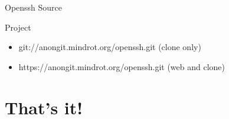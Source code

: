 \documentclass[10pt, compress, aspectratio=169]{beamer}
\begin{document}
\begin{frame}{Openssh Source}
  \begin{alertblock}{Project}
    \begin{itemize}
      \item git://anongit.mindrot.org/openssh.git (clone only)
      \item https://anongit.mindrot.org/openssh.git (web and clone)
    \end{itemize}
  \end{alertblock}
\end{frame}

\section{That's it!}
\begin{frame}[standout]
   \begin{center}\ccbysa\end{center}
\end{frame}

\maketitle
\end{document}
